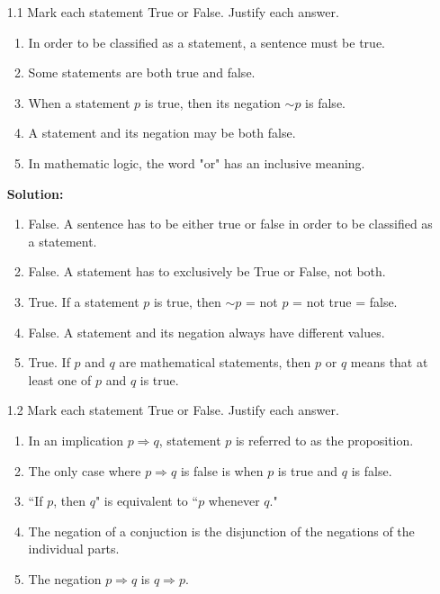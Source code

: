 \begin{enumerate}
   \item[1.1] Mark each statement True or False. Justify each answer.
      \begin{enumerate}
         \item In order to be classified as a statement, a sentence must be
               true.
         \item Some statements are both true and false.
         \item When a statement $p$ is true, then its negation $\sim$$p$ is
               false.
         \item A statement and its negation may be both false.
         \item In mathematic logic, the word "or" has an inclusive meaning.
      \end{enumerate}

      \textbf{Solution:} 

      \begin{enumerate}
         \item False. A sentence has to be either true or false in order to be
               classified as a statement.
         \item False. A statement has to exclusively be True or False, not both.
         \item True. If a statement $p$ is true, then $\sim$$p$ = not $p$ = not
               true = false.
         \item False. A statement and its negation always have different values.
         \item True. If $p$ and $q$ are mathematical statements, then $p$ or $q$
               means that at least one of $p$ and $q$ is true.
      \end{enumerate}

   \item[1.2] Mark each statement True or False. Justify each answer.
      \begin{enumerate}
         \item In an implication $p \Rightarrow q$, statement $p$ is referred to
               as the proposition.
         \item The only case where $p \Rightarrow q$ is false is when $p$ is
               true and $q$ is false.
         \item ``If $p$, then $q$" is equivalent to ``$p$ whenever $q$."
         \item The negation of a conjuction is the disjunction of the negations
               of the individual parts.
         \item The negation $p \Rightarrow q$ is $q \Rightarrow p$.
      \end{enumerate}


\end{enumerate}
